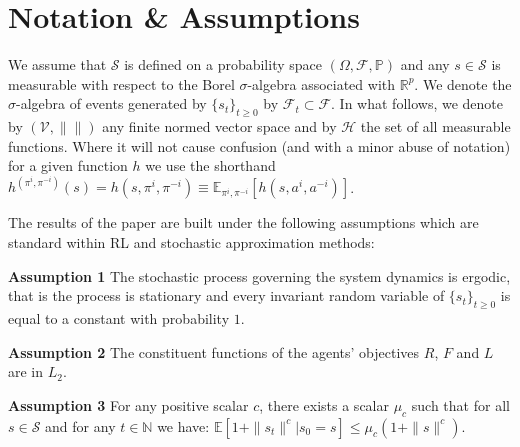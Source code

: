 \documentclass{article}
\begin{document}


\clearpage
\section{Notation \& Assumptions}\label{sec:notation_appendix}


We assume that $\mathcal{S}$ is defined on a probability space $(\Omega,\mathcal{F},\mathbb{P})$ and any $s\in\mathcal{S}$ is measurable with respect
to the Borel $\sigma$-algebra associated with $\mathbb{R}^p$. We denote the $\sigma$-algebra of events generated by $\{s_t\}_{t\geq 0}$
by $\mathcal{F}_t\subset \mathcal{F}$. In what follows, we denote by $\left( \mathcal{V},\|\|\right)$ any finite normed vector space and by $\mathcal{H}$ the set of all measurable functions.  Where it will not cause confusion (and with a minor abuse of notation) for a given function $h$ we use the shorthand $h^{(\pi^{i},\pi^{-i})}(s)= h(s,\pi^i,\pi^{-i})\equiv\mathbb{E}_{\pi^i,\pi^{-i}}[h(s,a^i,a^{-i})]$.


The results of the paper are built under the following assumptions which are standard within RL and stochastic approximation methods:

\textbf{Assumption 1}
The stochastic process governing the system dynamics is ergodic, that is  the process is stationary and every invariant random variable of $\{s_t\}_{t\geq 0}$ is equal to a constant with probability $1$.


\textbf{Assumption 2}
The constituent functions of the agents' objectives $R$, $F$ and $L$ are in $L_2$.

\textbf{Assumption 3}
For any positive scalar $c$, there exists a scalar $\mu_c$ such that for all $s\in\mathcal{S}$ and for any $t\in\mathbb{N}$ we have: $
    \mathbb{E}\left[1+\|s_t\|^c|s_0=s\right]\leq \mu_c(1+\|s\|^c)$.
\end{document}
